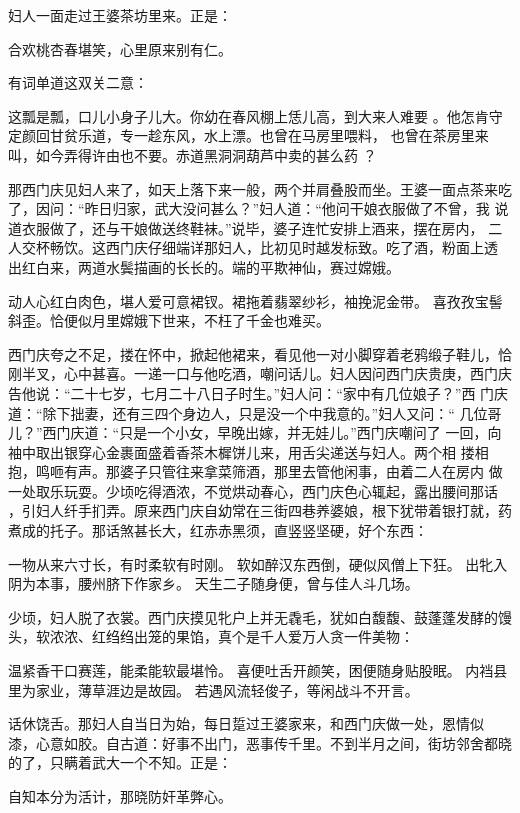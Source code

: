 妇人一面走过王婆茶坊里来。正是：

合欢桃杏春堪笑，心里原来别有仁。

有词单道这双关二意：

这瓢是瓢，口儿小身子儿大。你幼在春风棚上恁儿高，到大来人难要
。他怎肯守定颜回甘贫乐道，专一趁东风，水上漂。也曾在马房里喂料，
也曾在茶房里来叫，如今弄得许由也不要。赤道黑洞洞葫芦中卖的甚么药
？

那西门庆见妇人来了，如天上落下来一般，两个并肩叠股而坐。王婆一面点茶来吃
了，因问：“昨日归家，武大没问甚么？”妇人道：“他问干娘衣服做了不曾，我
说道衣服做了，还与干娘做送终鞋袜。”说毕，婆子连忙安排上酒来，摆在房内，
二人交杯畅饮。这西门庆仔细端详那妇人，比初见时越发标致。吃了酒，粉面上透
出红白来，两道水鬓描画的长长的。端的平欺神仙，赛过嫦娥。

动人心红白肉色，堪人爱可意裙钗。裙拖着翡翠纱衫，袖挽泥金带。
喜孜孜宝髻斜歪。恰便似月里嫦娥下世来，不枉了千金也难买。

西门庆夸之不足，搂在怀中，掀起他裙来，看见他一对小脚穿着老鸦缎子鞋儿，恰
刚半叉，心中甚喜。一递一口与他吃酒，嘲问话儿。妇人因问西门庆贵庚，西门庆
告他说：“二十七岁，七月二十八日子时生。”妇人问：“家中有几位娘子？”西
门庆道：“除下拙妻，还有三四个身边人，只是没一个中我意的。”妇人又问：“
几位哥儿？”西门庆道：“只是一个小女，早晚出嫁，并无娃儿。”西门庆嘲问了
一回，向袖中取出银穿心金裹面盛着香茶木樨饼儿来，用舌尖递送与妇人。两个相
搂相抱，鸣咂有声。那婆子只管往来拿菜筛酒，那里去管他闲事，由着二人在房内
做一处取乐玩耍。少顷吃得酒浓，不觉烘动春心，西门庆色心辄起，露出腰间那话
，引妇人纤手扪弄。原来西门庆自幼常在三街四巷养婆娘，根下犹带着银打就，药
煮成的托子。那话煞甚长大，红赤赤黑须，直竖竖坚硬，好个东西：

一物从来六寸长，有时柔软有时刚。
软如醉汉东西倒，硬似风僧上下狂。
出牝入阴为本事，腰州脐下作家乡。
天生二子随身便，曾与佳人斗几场。

少顷，妇人脱了衣裳。西门庆摸见牝户上并无毳毛，犹如白馥馥、鼓蓬蓬发酵的馒
头，软浓浓、红绉绉出笼的果馅，真个是千人爱万人贪一件美物：

温紧香干口赛莲，能柔能软最堪怜。
喜便吐舌开颜笑，困便随身贴股眠。
内裆县里为家业，薄草涯边是故园。
若遇风流轻俊子，等闲战斗不开言。

话休饶舌。那妇人自当日为始，每日踅过王婆家来，和西门庆做一处，恩情似
漆，心意如胶。自古道：好事不出门，恶事传千里。不到半月之间，街坊邻舍都晓
的了，只瞒着武大一个不知。正是：

自知本分为活计，那晓防奸革弊心。

